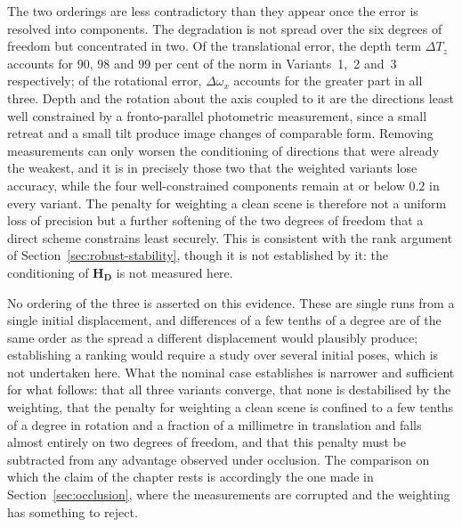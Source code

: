 The two orderings are less contradictory than they appear once the error is
resolved into components. The degradation is not spread over the six degrees of
freedom but concentrated in two. Of the translational error, the depth term
$\Delta T_z$ accounts for $90$, $98$ and $99$ per cent of the norm in
Variants~1,~2 and~3 respectively; of the rotational error, $\Delta\omega_x$
accounts for the greater part in all three. Depth and the rotation about the
axis coupled to it are the directions least well constrained by a
fronto-parallel photometric measurement, since a small retreat and a small
tilt produce image changes of comparable form. Removing measurements can only
worsen the conditioning of directions that were already the weakest, and it is
in precisely those two that the weighted variants lose accuracy, while the four
well-constrained components remain at or below $0.2$ in every variant. The
penalty for weighting a clean scene is therefore not a uniform loss of
precision but a further softening of the two degrees of freedom that a direct
scheme constrains least securely. This is consistent with the rank argument of
Section~\ref{sec:robust-stability}, though it is not established by it: the
conditioning of $\mathbf{H}_{\mathbf{D}}$ is not measured here.

No ordering of the three is asserted on this evidence. These are single runs
from a single initial displacement, and differences of a few tenths of a degree
are of the same order as the spread a different displacement would plausibly
produce; establishing a ranking would require a study over several initial
poses, which is not undertaken here. What the nominal
case establishes is narrower and sufficient for what follows: that all three
variants converge, that none is destabilised by the weighting, that the penalty
for weighting a clean scene is confined to a few tenths of a degree in rotation
and a fraction of a millimetre in translation and falls almost entirely on two
degrees of freedom, and that this penalty must be subtracted from any advantage
observed under occlusion. The comparison on which the claim of the chapter
rests is accordingly the one made in Section~\ref{sec:occlusion}, where the
measurements are corrupted and the weighting has something to reject.


